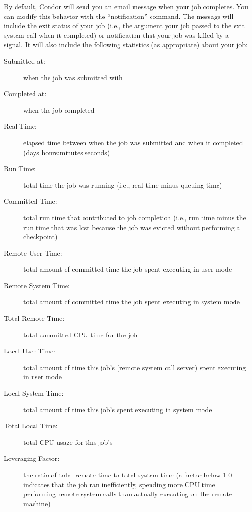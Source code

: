 By default, Condor will send you an email message
when your job completes.  You can modify this behavior with the
 ``notification'' command.
The message will include the exit status of your job (i.e., the
argument your job passed to the exit system call when it completed) or
notification that your job was killed by a signal.  It will also
include the following statistics (as appropriate) about your job:

\begin{description}

\item[Submitted at:] when the job was submitted with 

\item[Completed at:] when the job completed

\item[Real Time:] elapsed time between when the job was submitted and
when it completed (days hours:minutes:seconds)

\item[Run Time:] total time the job was running (i.e., real time minus
queuing time)

\item[Committed Time:] total run time that contributed to job
completion (i.e., run time minus the run time that was lost because
the job was evicted without performing a checkpoint)

\item[Remote User Time:] total amount of committed time the job spent
executing in user mode

\item[Remote System Time:] total amount of committed time the job spent
executing in system mode 

\item[Total Remote Time:] total committed CPU time for the job

\item[Local User Time:] total amount of time this job's
 (remote system call server) spent executing in user
mode

\item[Local System Time:] total amount of time this job's
 spent executing in system mode

\item[Total Local Time:] total CPU usage for this job's 

\item[Leveraging Factor:] the ratio of total remote time to total
system time (a factor below 1.0 indicates that the job ran
inefficiently, spending more CPU time performing remote system calls
than actually executing on the remote machine)


\end{description}
